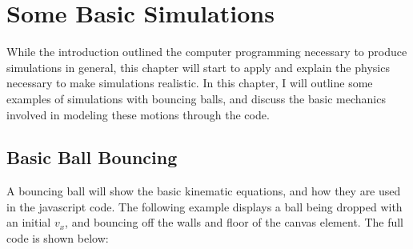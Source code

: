 
\chapter{Some Basic Simulations} %

\label{Chapter1} %




While the introduction outlined the computer programming necessary to produce simulations in general, this chapter will start to apply and explain the physics necessary to make simulations realistic.  In this chapter, I will outline some examples of simulations with bouncing balls, and discuss the basic mechanics involved in modeling these motions through the code.



\section{Basic Ball Bouncing}

A bouncing ball will show the basic kinematic equations, and how they are used in the javascript code.  The following example displays a ball being dropped with an initial $v_x$, and bouncing off the walls and floor of the canvas element.  The full code is shown below:





